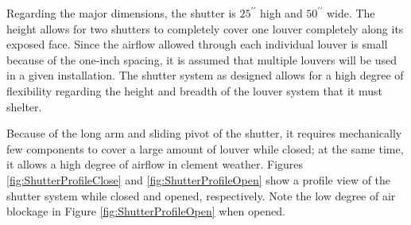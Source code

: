 \documentclass[12pt,letterpaper]{report}
\newcommand{\inchsign}{^{\prime\prime}} %
\begin{document}
		Regarding the major dimensions, the shutter is $25\inchsign$ high and $50\inchsign$ wide.  The height allows for two shutters to completely cover one louver completely along its exposed face.  Since the airflow allowed through each individual louver is small because of the one-inch spacing, it is assumed that multiple louvers will be used in a given installation.  The shutter system as designed allows for a high degree of flexibility regarding the height and breadth of the louver system that it must shelter.
		
		Because of the long arm and sliding pivot of the shutter, it requires mechanically few components to cover a large amount of louver while closed; at the same time, it allows a high degree of airflow in clement weather.  Figures \ref{fig:ShutterProfileClose} and \ref{fig:ShutterProfileOpen} show a profile view of the shutter system while closed and opened, respectively.  Note the low degree of air blockage in Figure \ref{fig:ShutterProfileOpen} when opened.
		
\end{document}
